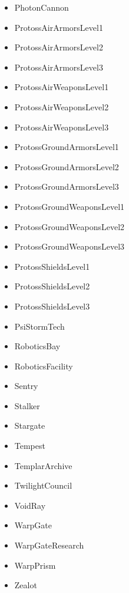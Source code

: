 \begin{anexosenv}
\begin{multicols}{2}
\begin{itemize}
		\item PhotonCannon
		\item ProtossAirArmorsLevel1
		\item ProtossAirArmorsLevel2
		\item ProtossAirArmorsLevel3
		\item ProtossAirWeaponsLevel1
		\item ProtossAirWeaponsLevel2
		\item ProtossAirWeaponsLevel3
		\item ProtossGroundArmorsLevel1
		\item ProtossGroundArmorsLevel2
		\item ProtossGroundArmorsLevel3
		\item ProtossGroundWeaponsLevel1
		\item ProtossGroundWeaponsLevel2
		\item ProtossGroundWeaponsLevel3
		\item ProtossShieldsLevel1
		\item ProtossShieldsLevel2
		\item ProtossShieldsLevel3
		\item PsiStormTech
		\item RoboticsBay
		\item RoboticsFacility
		\item Sentry
		\item Stalker
		\item Stargate
		\item Tempest
		\item TemplarArchive
		\item TwilightCouncil
		\item VoidRay
		\item WarpGate
		\item WarpGateResearch
		\item WarpPrism
		\item Zealot
	\end{itemize}
\end{multicols}

\end{anexosenv}


